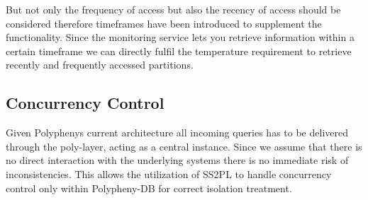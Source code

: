 But not only the frequency of access but also the recency of access should be considered therefore timeframes have been introduced to supplement the functionality.
Since the monitoring service lets you retrieve information within a certain timeframe we can directly fulfil the temperature requirement to retrieve
recently and frequently accessed partitions. 


\subsection{Concurrency Control}

Given Polyphenys current architecture all incoming queries has to be delivered through the poly-layer, acting as a central instance.
Since we assume that there is no direct interaction with the underlying systems there is no immediate risk of inconsistencies. 
This allows the utilization of SS2PL to handle concurrency control only within Polypheny-DB for correct isolation treatment.


